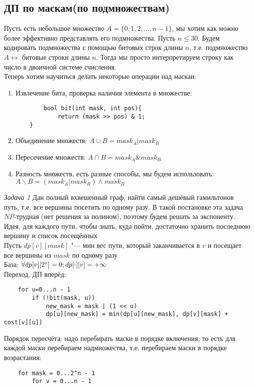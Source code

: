 \documentclass[a4paper, 12pt]{article}
\theoremstyle{plain}
\theoremstyle{definition}
\theoremstyle{remark}
\begin{document}
\subsection{ДП по маскам(по подмножествам)}
Пусть есть небольшое множество $A=\{0,1,2,\dots,n-1\}$, мы хотим как можно более эффективно представлять его подмножества. Пусть $n\leq30$. Будем кодировать подмножества с помощью битовых строк длины $n$, т.е. подмножество $A\leftrightarrow$ битовые строки длины $n$. Тогда мы просто интерпретируем строку как число в двоичной системе счисления.\\
Теперь хотим научиться делать некоторые операции над маскаи:
\begin{enumerate}
	\item Извлечение бита, проверка наличия элемента в множестве:
	\begin{verbatim}
		bool bit(int mask, int pos){
		    return (mask >> pos) & 1; 
	}
	\end{verbatim}
\item Объединение множеств: $A\cup B=mask_A | mask_B$
\item Пересечение множеств: $A\cap B =mask_A \& mask_B$
\item Разность множеств, есть разные способы, мы будем использовать: $A\backslash B=(mask_A | mask_B) \wedge mask_B$
\end{enumerate}
\textit{Задача 1} Дан полный вхвешенный граф, найти самый дешёвый гамильтонов путь, т.е. все вершины посетить по одному разу. В такой постановке эта задача $NP$-трудная (нет решения за полином), поэтому будем решать за экспоненту.\\
Идея, для каждого пути, чтобы знать, куда пойти, достаточно хранить последнюю вершину и список посещённых\\
Пусть $dp[v][mask]$ "--- мин вес пути, который заканчивается в $v$ и посещает все вершины из $mask$ по одному разу\\
База: $\forall dp[v][2^v]=0;\\
dp[\cdot][v]=+\infty$\\
Переход, ДП вперёд: 
\begin{verbatim}
	for u=0...n - 1
	    if (!bit(mask, u))
	        new_mask = mask | (1 << u)
	        dp[u][new_mask] = min(dp[u][new_mask], dp[v][mask] + cost[v][u])
\end{verbatim}
\newpage
Порядок пересчёта: надо перебирать маски в порядке включения, то есть для каждой маски перебираем надмножества, т.е. перебираем маски в порядке возрастания:
\begin{verbatim}
	for mask = 0...2^n - 1
	    for v = 0...n - 1
\end{verbatim}
\end{document}
